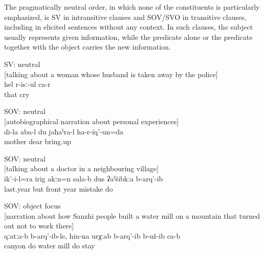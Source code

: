 The pragmatically neutral order, in which none of the constituents is particularly emphasized, is SV in intransitive clauses and SOV/SVO in transitive clauses, including in elicited sentences without any context. In such clauses, the subject usually represents given information, while the predicate alone or the predicate together with the object carries the new information.
%
\begin{exe}
	\ex	SV: neutral \\\label{ex:She is crying SV}%
		[talking about a woman whose husband is taken away by the police]\\
	\gll	hel	r-isː-ul	ca-r\\
		that cry	\\
	\glt	{}

	\ex	SOV: neutral \\	\label{ex:‎My mother protected me (kept me dear) SOV}
		[autobiographical narration about personal experiences]\\
	\gll	di-la	aba-l	du	jaħaˁra-l ha-r-iq'-un=da\\
			mother		dear	bring.up\\
	\glt	{}

	\ex	SOV: neutral \\	\label{ex:But he also, not in the last year but two years ago, made a mistake SOV}
		[talking about a doctor in a neighbouring village]\\
	\gll	ik'-i-l=ra	irig	akːu=n	sala-b	dus	ʡaˁšibkːa	b-arq'-ib\\
			last.year	but	front	year	mistake	do\\
	\glt	{}

	\ex	SOV: object focus\\				\label{ex:(They) built it in the canyon, (they) apparently built a water mill SOV}
		[narration about how Sanzhi people built a water mill on a mountain that turned out not to work there]\\
	\gll	qːatːa-b	b-arq'-ib-le,	hin-na	urχːab	b-arq'-ib	b-už-ib	ca-b\\
		canyon	do	water	mill	do	stay \\
	\glt	{}


\end{exe}
